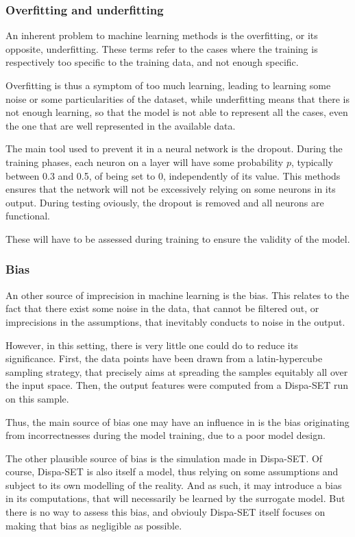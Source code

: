 \subsubsection{Overfitting and underfitting}

An inherent problem to machine learning methods is the overfitting, or its opposite, underfitting. These terms refer to the cases where the training is respectively too specific to the training data, and not enough specific.

Overfitting is thus a symptom of too much learning, leading to learning some noise or some particularities of the dataset, while underfitting means that there is not enough learning, so that the model is not able to represent all the cases, even the one that are well represented in the available data.

The main tool used to prevent it in a neural network is the dropout. During the training phases, each neuron on a layer will have some probability $p$, typically between 0.3 and 0.5, of being set to 0, independently of its value. This methods ensures that the network will not be excessively relying on some neurons in its output. During testing oviously, the dropout is removed and all neurons are functional.

These will have to be assessed during training to ensure the validity of the model.

\subsubsection{Bias\label{ssec:bias}}

An other source of imprecision in machine learning is the bias. This relates to the fact that there exist some noise in the data, that cannot be filtered out, or imprecisions in the assumptions, that inevitably conducts to noise in the output.

However, in this setting, there is very little one could do to reduce its significance. First, the data points have been drawn from a latin-hypercube sampling strategy, that precisely aims at spreading the samples equitably all over the input space. Then, the output features were computed from a Dispa-SET run on this sample.

Thus, the main source of bias one may have an influence in is the bias originating from incorrectnesses during the model training, due to a poor model design.

The other plausible source of bias is the simulation made in Dispa-SET. Of course, Dispa-SET is also itself a model, thus relying on some assumptions and subject to its own modelling of the reality. And as such, it may introduce a bias in its computations, that will necessarily be learned by the surrogate model. But there is no way to assess this bias, and obviouly Dispa-SET itself focuses on making that bias as negligible as possible.

